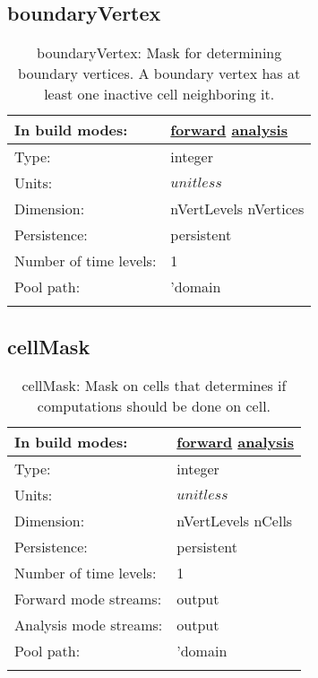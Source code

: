 \subsection[boundaryVertex]{boundaryVertex}
\label{subsec:var_sec_mesh_boundaryVertex}
\begin{center}
\begin{longtable}{| p{2.0in} | p{4.0in} |}
        \hline 
        In build modes: & \hyperref[subsec:forward_var_tab_mesh]{forward} \hyperref[subsec:analysis_var_tab_mesh]{analysis} \\
        \hline 
        Type: & integer \\
        \hline 
        Units: & $unitless$ \\
        \hline 
        Dimension: & nVertLevels nVertices \\
        \hline 
        Persistence: & persistent \\
        \hline 
        Number of time levels: & 1 \\
        \hline 
            Pool path: & 'domain %
 \\
		 \hline 
    \caption{boundaryVertex: Mask for determining boundary vertices. A boundary vertex has at least one inactive cell neighboring it.}
\end{longtable}
\end{center}
\subsection[cellMask]{cellMask}
\label{subsec:var_sec_mesh_cellMask}
\begin{center}
\begin{longtable}{| p{2.0in} | p{4.0in} |}
        \hline 
        In build modes: & \hyperref[subsec:forward_var_tab_mesh]{forward} \hyperref[subsec:analysis_var_tab_mesh]{analysis} \\
        \hline 
        Type: & integer \\
        \hline 
        Units: & $unitless$ \\
        \hline 
        Dimension: & nVertLevels nCells \\
        \hline 
        Persistence: & persistent \\
        \hline 
        Number of time levels: & 1 \\
        \hline 
		 Forward mode streams: &  output \\
        \hline 
		 Analysis mode streams: &  output \\
        \hline 
            Pool path: & 'domain %
 \\
		 \hline 
    \caption{cellMask: Mask on cells that determines if computations should be done on cell.}
\end{longtable}
\end{center}

